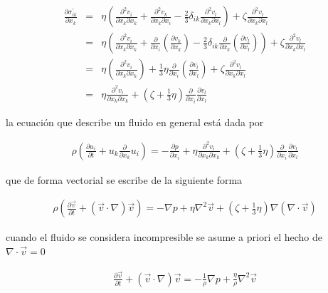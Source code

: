 \begin{eqnarray}
\frac{\partial \sigma^{'}_{ik}}{\partial x_{k}} &=& \eta\left(\frac{\partial^{2} v_{i}}{\partial x_{k}\partial x_{k}}+ \frac{\partial^{2} v_{k}}{\partial x_{k}\partial x_{i}}-\frac{2}{3}\delta_{ik} \frac{\partial^{2} v_{l}}{\partial x_{k} \partial x_{l}}\right)+\zeta \frac{\partial^{2} v_{l}}{\partial x_{k}\partial x_{l}}\nonumber \\
&=&\eta\left(\frac{\partial^{2} v_{i}}{\partial x_{k}\partial x_{k}} + \frac{\partial}{\partial x_{i}}\left(\frac{\partial v_{k}}{\partial x_{k}}\right)-\frac{2}{3}\delta_{ik}\frac{\partial}{\partial x_{k}}\left(\frac{\partial v_{l}}{\partial x_{l}}\right)\right) + \zeta \frac{\partial^{2} v_{l}}{\partial x_{k}\partial x_{l}}\nonumber \\
&=& \eta\left(\frac{\partial^{2} v_{i}}{\partial x_{k}\partial x_{k}}\right) + \frac{1}{3}\eta\frac{\partial}{\partial x_{i}}\left(\frac{\partial v_{l}}{\partial x_{l}}\right)+ \zeta \frac{\partial^{2} v_{l}}{\partial x_{k}\partial x_{l}}\nonumber \\
&=& \eta\frac{\partial^{2} v_{i}}{\partial x_{k}\partial x_{k}} + \left(\zeta + \frac{1}{3}\eta\right)\frac{\partial}{\partial x_{i}}\frac{\partial v_{l}}{\partial x_{l}}
\end{eqnarray}


\noindent la ecuación que describe un fluido en general está dada por 

\begin{eqnarray}
\rho\left(\frac{\partial u_{i}}{\partial t} + u_{k}\frac{\partial}{\partial x_{k}}u_{i}\right) = -\frac{\partial p}{\partial x_{i}} + \eta\frac{\partial^{2} v_{i}}{\partial x_{k}\partial x_{k}} + \left(\zeta + \frac{1}{3}\eta\right)\frac{\partial}{\partial x_{i}}\frac{\partial v_{l}}{\partial x_{l}}
\end{eqnarray}


\noindent que de forma vectorial se escribe de la siguiente forma

\begin{eqnarray}
\rho \left(\frac{\partial \vec{v}}{\partial t}+(\vec{v} \cdot \nabla )\vec{v}\right) = -\nabla p +\eta \nabla^{2}\vec{v} + \left(\zeta + \frac{1}{3}\eta\right)\nabla(\nabla \cdot \vec{v}) 
\end{eqnarray}

\noindent cuando el fluido se considera incompresible se asume a priori el hecho de $\nabla \cdot \vec{v} = 0$

\begin{eqnarray}
\label{NS}
\frac{\partial \vec{v}}{\partial t}+(\vec{v} \cdot \nabla )\vec{v} = -\frac{1}{\rho}\nabla p +\frac{\eta}{\rho} \nabla^{2}\vec{v}
\end{eqnarray}

